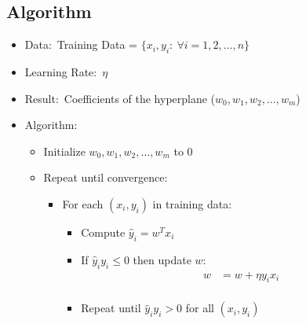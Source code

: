 \documentclass[12pt]{article}
\begin{document}
        \subsection{Algorithm}
            \begin{itemize}
                \item Data:\ Training Data = $\{x_i, y_i:\ \forall i = 1, 2, \ldots, n\}$
                \item Learning Rate:\ $\eta$
                \item Result:\ Coefficients of the hyperplane ($w_0, w_1, w_2, \ldots, w_m$)
                \item Algorithm:
                \begin{itemize}
                    \item Initialize $w_0, w_1, w_2, \ldots, w_m$ to $0$
                    \item Repeat until convergence:
                    \begin{itemize}
                        \item For each $(x_i, y_i)$ in training data:
                        \begin{itemize}
                            \item Compute $\hat{y}_i = w^T{x_i}$
                            \item If $\hat{y}_i{y_i} \le 0$ then update $w$:
                            \begin{align*}
                                w &= w + \eta{y_i}{x_i} \\
                            \end{align*}
                            \item Repeat until $\hat{y}_i{y_i} > 0$ for all $(x_i, y_i)$
                        \end{itemize}
                    \end{itemize}
                \end{itemize}
            \end{itemize}
\end{document}
